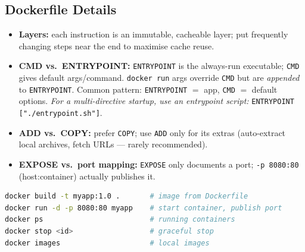 \documentclass[hidelinks]{article}
\begin{document}
\subsection{Dockerfile Details}
\begin{itemize}
  \item \textbf{Layers:} each instruction is an immutable, cacheable layer; put frequently changing
        steps near the end to maximise cache reuse.
  \item \textbf{CMD vs.\ ENTRYPOINT:} \texttt{ENTRYPOINT} is the always-run executable;
        \texttt{CMD} gives default args/command. \texttt{docker run} args override \texttt{CMD} but
        are \emph{appended} to \texttt{ENTRYPOINT}. Common pattern: \texttt{ENTRYPOINT} $=$ app,
        \texttt{CMD} $=$ default options. \emph{For a multi-directive startup, use an entrypoint
        script:} \texttt{ENTRYPOINT ["./entrypoint.sh"]}.
  \item \textbf{ADD vs.\ COPY:} prefer \texttt{COPY}; use \texttt{ADD} only for its extras
        (auto-extract local archives, fetch URLs --- rarely recommended).
  \item \textbf{EXPOSE vs.\ port mapping:} \texttt{EXPOSE} only documents a port;
        \texttt{-p 8080:80} (host:container) actually publishes it.
\end{itemize}

\begin{lstlisting}[language=bash,caption={Common Docker commands (added)}]
docker build -t myapp:1.0 .       # image from Dockerfile
docker run -d -p 8080:80 myapp    # start container, publish port
docker ps                         # running containers
docker stop <id>                  # graceful stop
docker images                     # local images
\end{lstlisting}
\end{document}
